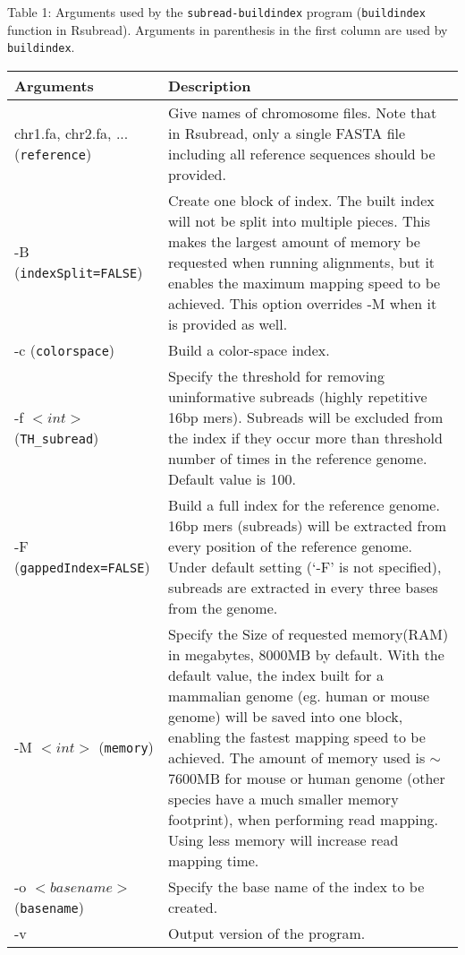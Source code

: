 \documentclass[12pt]{report}
\newcommand{\code}[1]{{\small\texttt{#1}}}
\newcommand{\Rsubread}{\textsf{Rsubread}}
\begin{document}
\begin{table}[h]
\raggedright{Table 1: Arguments used by the \code{subread-buildindex} program (\code{buildindex} function in \Rsubread).
Arguments in parenthesis in the first column are used by \code{buildindex}.\newline\\}
\begin{tabular}{|p{4cm}|p{12cm}|}
\hline
Arguments & Description \\
\hline
chr1.fa, chr2.fa, ... \newline (\code{reference}) & Give names of chromosome files. Note that in {\Rsubread}, only a single FASTA file including all reference sequences should be provided.\\
\hline
-B \newline (\code{indexSplit=FALSE}) & Create one block of index.  The built index will not be split into multiple pieces. This makes the largest amount of memory be requested when running alignments, but it enables the maximum mapping speed to be achieved. This option overrides -M when it is provided as well.\\
\hline
-c \newline (\code{colorspace}) & Build a color-space index.\\
\hline
-f $<int>$ \newline (\code{TH\_subread}) & Specify the threshold for removing uninformative subreads (highly repetitive 16bp mers). Subreads will be excluded from the index if they occur more than threshold number of times in the reference genome. Default value is 100.\\
\hline
-F \newline (\code{gappedIndex=FALSE}) & Build a full index for the reference genome. 16bp mers (subreads) will be extracted from every position of the reference genome. Under default setting (`-F' is not specified), subreads are extracted in every three bases from the genome.\\
\hline
-M $<int>$ \newline (\code{memory}) & Specify the Size of requested memory(RAM) in megabytes, 8000MB by default. With the default value, the index built for a mammalian genome (eg. human or mouse genome) will be saved into one block, enabling the fastest mapping speed to be achieved. The amount of memory used is $\sim$ 7600MB for mouse or human genome (other species have a much smaller memory footprint), when performing read mapping. Using less memory will increase read mapping time.\\
\hline
-o $<basename>$ \newline (\code{basename}) & Specify the base name of the index to be created.\\
\hline
-v & Output version of the program. \\
\hline
\end{tabular}
\end{table}
\end{document}
